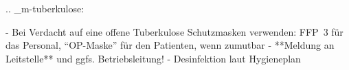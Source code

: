 
.. _m-tuberkulose:


\begin{itemize}
  -   Bei Verdacht auf eine offene Tuberkulose
  Schutzmasken verwenden: FFP~3 für das Personal, \enquote{OP-Maske} für den
  Patienten, wenn zumutbar
  -   **Meldung an Leitstelle** und ggfs. Betriebsleitung!
  -   Desinfektion laut Hygieneplan
\end{itemize}
